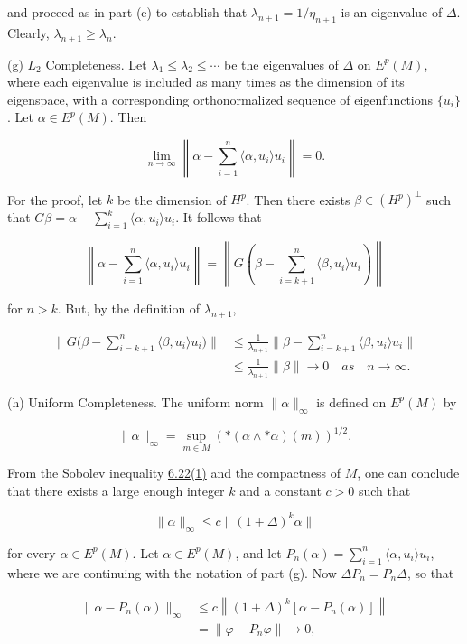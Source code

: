 \begin{problemset}
and proceed as in part (e) to establish that  $ \lambda_{n+1} = 1/\eta_{n+1} $ is an eigenvalue of  $ \Delta $. Clearly,  $ \lambda_{n+1} \geq \lambda_n $.

(g) $L_{2}$ Completeness. Let $\lambda_{1} \leq \lambda_{2} \leq \cdots$ be the eigenvalues of $\Delta$ on $E^{p}(M)$, where each eigenvalue is included as many times as the dimension of its eigenspace, with a corresponding orthonormalized sequence of eigenfunctions $\{u_{i}\}$. Let $\alpha \in E^{p}(M)$. Then

\[
\lim_{n\to\infty}\left\|\alpha-\sum_{i=1}^{n}\langle\alpha,u_{i}\rangle u_{i}\right\|=0.
\]

For the proof, let $k$ be the dimension of $H^p$. Then there exists $\beta \in (H^p)^\perp$ such that $G\beta = \alpha - \sum_{i=1}^{k} \langle \alpha, u_i \rangle u_i$. It follows that

\[
\left\|\alpha-\sum_{i=1}^{n}\langle\alpha,u_{i}\rangle u_{i}\right\|=\left\|G\left(\beta-\sum_{i=k+1}^{n}\langle\beta,u_{i}\rangle u_{i}\right)\right\|
\]

for $n > k$. But, by the definition of $\lambda_{n+1}$,


\begin{align*}\bigg\|G\bigg(\beta-\sum_{i=k+1}^{n}\langle\beta,u_{i}\rangle u_{i}\bigg)\bigg\|&\leq\frac{1}{\lambda_{n+1}}\bigg\|\beta-\sum_{i=k+1}^{n}\langle\beta,u_{i}\rangle u_{i}\bigg\|\\&\leq\frac{1}{\lambda_{n+1}}\|\beta\|\to0\quad as\quad n\to\infty.\end{align*}


(h) Uniform Completeness. The uniform norm  $ \|\alpha\|_{\infty} $ is defined on  $ E^{p}(M) $ by

\[
\|\alpha\|_{\infty}=\sup_{m\in M}\left(*(\alpha\wedge*\alpha)(m)\right)^{1/2}.
\]

From the Sobolev inequality \hyperref[thm:6.22]{6.22(1)} and the compactness of $M$, one can conclude that there exists a large enough integer $k$ and a constant $c > 0$ such that

\[
\|\alpha\|_{\infty}\leq c\|(1+\Delta)^{k}\alpha\|
\]

for every $\alpha \in E^p(M)$. Let $\alpha \in E^p(M)$, and let $P_n(\alpha) = \sum_{i=1}^{n} \langle \alpha, u_i \rangle u_i$, where we are continuing with the notation of part (g). Now $\Delta P_n = P_n \Delta$, so that

\[
\begin{aligned}{\|\alpha-P_{n}(\alpha)\|_{\infty}}&{{}\leq c\left\|(1+\Delta)^{k}[\alpha-P_{n}(\alpha)]\right\|}\\ {}&{{}=\|\varphi-P_{n}\varphi\|\to0,}\\ \end{aligned}
\]


\end{problemset}
